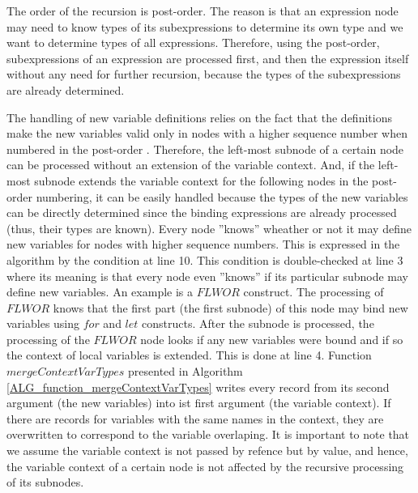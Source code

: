 The order of the recursion is post-order. The reason is that an expression node may need to know types of its subexpressions to determine its own type and we want to determine types of all expressions. Therefore, using the post-order, subexpressions of an expression are processed first, and then the expression itself without any need for further recursion, because the types of the subexpressions are already determined.

The handling of new variable definitions relies on the fact that the definitions make the new variables valid only in nodes with a higher sequence number when numbered in the post-order . Therefore, the left-most subnode of a certain node can be processed without an extension of the variable context. And, if the left-most subnode extends the variable context for the following nodes in the post-order numbering, it can be easily handled because the types of the new variables can be directly determined since the binding expressions are already processed (thus, their types are known). Every node ''knows'' wheather or not it may define new variables for nodes with higher sequence numbers. This is expressed in the algorithm by the condition at line 10. This condition is double-checked at line 3 where its meaning is that every node even ''knows'' if its particular subnode may define new variables. An example is a $FLWOR$ construct. The processing of $FLWOR$ knows that the first part (the first subnode) of this node may bind new variables using $for$ and $let$ constructs. After the subnode is processed, the processing of the $FLWOR$ node looks if any new variables were bound and if so the context of local variables is extended. This is done at line 4. Function $mergeContextVarTypes$ presented in Algorithm \ref{ALG_function_mergeContextVarTypes} writes every record from its second argument (the new variables) into ist first argument (the variable context). If there are records for variables with the same names in the context, they are overwritten to correspond to the variable overlaping. It is important to note that we assume the variable context is not passed by refence but by value, and hence, the variable context of a certain node is not affected by the recursive processing of its subnodes.


